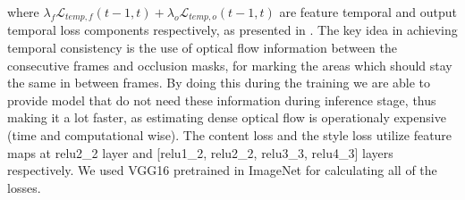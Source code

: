 \documentclass[a4paper,conference]{IEEEtran}
\begin{document}
where $\lambda_{f} \mathcal{L}_{temp,f}(t-1,t) + \lambda_{o} \mathcal{L}_{temp,o}(t-1,t)$ are feature temporal and output temporal loss components respectively, as presented in \cite{Reconet}. The key idea in achieving temporal consistency is the use of optical flow information between the consecutive frames and occlusion masks, for marking the areas which should stay the same in between frames. By doing this during the training we are able to provide model that do not need these information during inference stage, thus making it a lot faster, as estimating dense optical flow is operationaly expensive (time and computational wise). The content loss and the style loss utilize feature maps at relu2\_2 layer and [relu1\_2, relu2\_2, relu3\_3, relu4\_3] layers respectively. We used VGG16 pretrained in ImageNet for calculating all of the losses.










\end{document}
